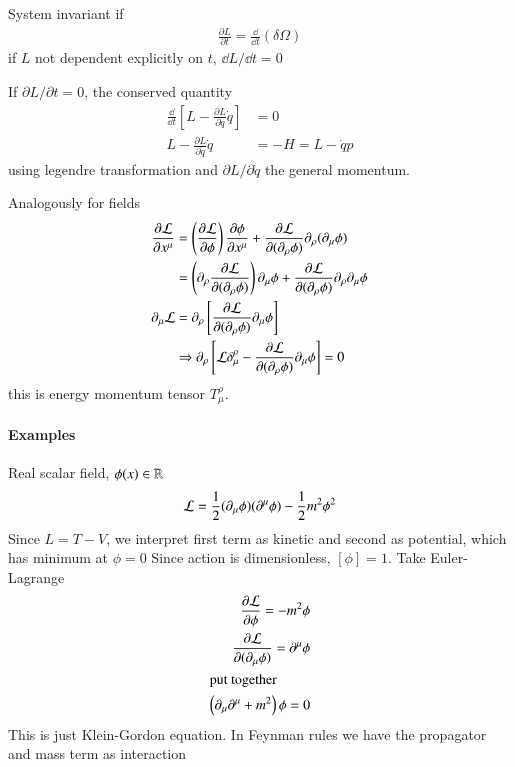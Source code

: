 System invariant if
\begin{align}
   \frac{\partial L}{\partial t} = \frac{\dd}{\dd{t} } (\delta \Omega)
\end{align}
if $L$ not dependent explicitly on $t$, $\dd{L} / \dd{t} = 0$

If $\partial L / \partial t = 0$, the conserved quantity
\begin{align*}
   \frac{\dd}{\dd{t}} \left[ L - \frac{\partial L}{\partial \dot{q}} \dot{q} \right] &= 0 \\
   L - \frac{\partial L}{\partial \dot{q}} \dot{q} &= -H = L - \dot{q} p
\end{align*}
using legendre transformation and $\partial L / \partial \dot{q}$ the general momentum.

Analogously for fields
\begin{align*}
   \frac{\partial \mathcal{L}}{\partial x^\mu} &= \left(\frac{\partial \mathcal{L}}{\partial \phi} \right) \frac{\partial \phi}{\partial x^\mu} + \frac{\partial \mathcal{L}}{ \partial (\partial_\rho \phi)} \partial_\rho (\partial_\mu \phi) \\
                                        &= \left(\partial_\rho \frac{\partial \mathcal{L}}{\partial(\partial_\rho \phi)} \right) \partial_\mu \phi + \frac{\partial \mathcal{L}}{ \partial (\partial_\rho \phi)} \partial_\rho \partial_\mu \phi \\
                     \partial_\mu \mathcal{L} &= \partial_\rho \left[ \frac{\partial \mathcal{L}}{\partial(\partial_\rho \phi)} \partial_\mu \phi \right]  \\
                                       &\Rightarrow \partial_\rho \left[ \mathcal{L} \delta_{\mu}^{\rho} - \frac{\partial \mathcal{L}}{\partial (\partial_\rho \phi)} \partial_\mu \phi \right] = 0
\end{align*}
this is energy momentum tensor $T_{\mu}^{\rho}$.

\paragraph{Examples}
Real scalar field, $\phi(x) \in \mathbb{R}$
\begin{align}
   \mathcal{L} = \frac{1}{2} (\partial_\mu \phi) (\partial^\mu \phi) - \frac{1}{2} m^2 \phi^2
\end{align}
Since $L = T - V$, we interpret first term as kinetic and second as potential, which has minimum at $\phi=0$
Since action is dimensionless, $[\phi] = 1$. Take Euler-Lagrange 
\begin{align*}
   \frac{\partial \mathcal{L}}{\partial \phi} = - m^2 \phi \\
   \frac{\partial \mathcal{L}}{\partial (\partial_\mu \phi)} = \partial^\mu \phi \\
   \shortintertext{put together}
   \left( \partial_\mu \partial^\mu + m^2 \right)\phi = 0
\end{align*}
This is just Klein-Gordon equation. In Feynman rules we have the propagator and mass term as interaction

